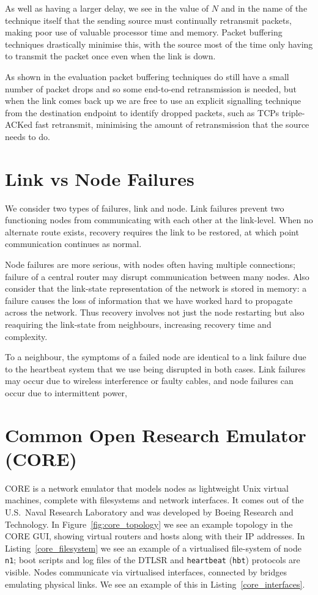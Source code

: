 \documentclass[withindex,glossary,openany]{cam-thesis}
\begin{document}
As well as having a larger delay, we see in the value of $N$ and in the name of the technique itself that the sending source must continually retransmit packets, making poor use of valuable processor time and memory. Packet buffering techniques drastically minimise this, with the source most of the time only having to transmit the packet once even when the link is down.

As shown in the evaluation packet buffering techniques do still have a small number of packet drops and so some end-to-end retransmission is needed, but when the link comes back up we are free to use an explicit signalling technique from the destination endpoint to identify dropped packets, such as TCPs triple-ACKed fast retransmit, minimising the amount of retransmission that the source needs to do.

\section{Link vs Node Failures}
\label{sec:link_vs_node_failures}

We consider two types of failures, link and node. Link failures prevent two functioning nodes from communicating with each other at the link-level. When no alternate route exists, recovery requires the link to be restored, at which point communication continues as normal.

Node failures are more serious, with nodes often having multiple connections; failure of a central router may disrupt communication between many nodes. Also consider that the link-state representation of the network is stored in memory: a failure causes the loss of information that we have worked hard to propagate across the network. Thus recovery involves not just the node restarting but also reaquiring the link-state from neighbours, increasing recovery time and complexity.

To a neighbour, the symptoms of a failed node are identical to a link failure due to the heartbeat system that we use being disrupted in both cases. Link failures may occur due to wireless interference or faulty cables, and node failures can occur due to intermittent power, 

\section{Common Open Research Emulator (CORE)}
\label{sec:core}

CORE \cite{CORE} is a network emulator that models nodes as lightweight Unix virtual machines, complete with filesystems and network interfaces. It comes out of the U.S.\ Naval Research Laboratory and was developed by Boeing Research and Technology. In Figure~\ref{fig:core_topology} we see an example topology in the CORE GUI, showing virtual routers and hosts along with their IP addresses. In Listing~\ref{core_filesystem} we see an example of a virtualised file-system of node \texttt{n1}; boot scripts and log files of the DTLSR and \texttt{heartbeat} (\texttt{hbt}) protocols are visible. Nodes communicate via virtualised interfaces, connected by bridges emulating physical links. We see an example of this in Listing~\ref{core_interfaces}.
\end{document}
